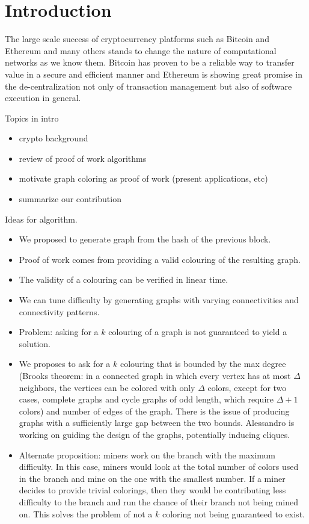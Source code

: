 
\section{Introduction}

The large scale success of cryptocurrency platforms such as Bitcoin  \cite{nakamoto2008bitcoin} and Ethereum \cite{wood2014ethereum} and many others stands to change the nature of computational networks as we know them. Bitcoin has proven to be a reliable way to transfer value in a secure and efficient manner and Ethereum is showing great promise in the de-centralization not only of transaction management but also of software execution in general. 


Topics in intro
\begin{itemize}
	\item crypto background
	\item review of proof of work algorithms
	\item motivate graph coloring as proof of work (present applications, etc)
	\item summarize our contribution
\end{itemize}


Ideas for algorithm.
\begin{itemize}
	\item We proposed to generate graph from the hash of the previous block.
	\item Proof of work comes from providing a valid colouring of the resulting graph.
	\item The validity of a colouring can be verified in linear time.
	\item We can tune difficulty by generating graphs with varying connectivities and connectivity patterns.
	\item Problem: asking for a $k$ colouring of a graph is not guaranteed to yield a solution.
	\item We proposes to ask for a $k$ colouring that is bounded by the max degree (Brooks theorem: in a connected graph in which every vertex has at most $\Delta$ neighbors, the vertices can be colored with only $\Delta$ colors, except for two cases, complete graphs and cycle graphs of odd length, which require $\Delta + 1$ colors) and number of edges of the graph. There is the issue of producing graphs with a sufficiently large gap between the two bounds. Alessandro is working on guiding the design of the graphs, potentially inducing cliques.
	\item Alternate proposition: miners work on the branch with the maximum difficulty. In this case, miners would look at the total number of colors used in the branch and mine on the one with the smallest number. If a miner decides to provide trivial colorings, then they would be contributing less difficulty to the branch and run the chance of their branch not being mined on. This solves the problem of not a $k$ coloring not being guaranteed to exist.
\end{itemize}